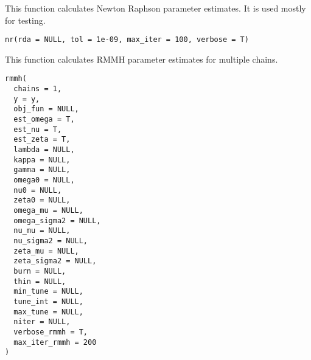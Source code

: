 \documentclass[a4paper]{book}
\begin{document}
%
\begin{Description}\relax
This function calculates Newton Raphson parameter estimates. It is used
mostly for testing.
\end{Description}
%
\begin{Usage}
\begin{verbatim}
nr(rda = NULL, tol = 1e-09, max_iter = 100, verbose = T)
\end{verbatim}
\end{Usage}
%
\begin{Description}\relax
This function calculates RMMH parameter estimates for multiple chains.
\end{Description}
%
\begin{Usage}
\begin{verbatim}
rmmh(
  chains = 1,
  y = y,
  obj_fun = NULL,
  est_omega = T,
  est_nu = T,
  est_zeta = T,
  lambda = NULL,
  kappa = NULL,
  gamma = NULL,
  omega0 = NULL,
  nu0 = NULL,
  zeta0 = NULL,
  omega_mu = NULL,
  omega_sigma2 = NULL,
  nu_mu = NULL,
  nu_sigma2 = NULL,
  zeta_mu = NULL,
  zeta_sigma2 = NULL,
  burn = NULL,
  thin = NULL,
  min_tune = NULL,
  tune_int = NULL,
  max_tune = NULL,
  niter = NULL,
  verbose_rmmh = T,
  max_iter_rmmh = 200
)
\end{verbatim}
\end{Usage}
%
\end{document}
